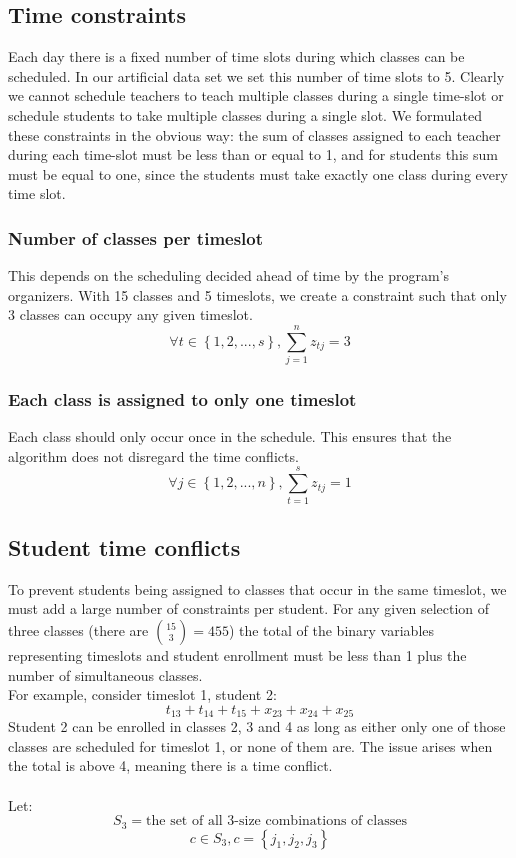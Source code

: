 \documentclass[11pt]{article}
\begin{document}
\subsection{Time constraints}
Each day there is a fixed number of time slots during which classes can be scheduled. In our artificial data set we set this number of time slots to 5. Clearly we cannot schedule teachers to teach multiple classes during a single time-slot or schedule students to take multiple classes during a single slot. We formulated these constraints in the obvious way: the sum of classes assigned to each teacher during each time-slot must be less than or equal to 1, and for students this sum must be equal to one, since the students must take exactly one class during every time slot.\\
\subsubsection{Number of classes per timeslot}
This depends on the scheduling decided ahead of time by the program's organizers. With 15 classes and 5 timeslots, we create a constraint such that only 3 classes can occupy any given timeslot.
\[\forall t \in \left\{ {1,2,...,s}\right\}, \sum_{j=1}^{n}z_{tj} = 3\]
\subsubsection{Each class is assigned to only one timeslot}
Each class should only occur once in the schedule. This ensures that the algorithm does not disregard the time conflicts.
\[\forall j \in \left\{ {1,2,...,n}\right\}, \sum_{t=1}^{s}z_{tj} = 1\]
\subsection{Student time conflicts}
To prevent students being assigned to classes that occur in the same timeslot, we must add a large number of constraints per student. For any given selection of three classes (there are $\binom {15}{3} = 455$) the total of the binary variables representing timeslots and student enrollment must be less than 1 plus the number of simultaneous classes.\\ 
\indent For example, consider timeslot 1, student 2:\\
\[t_{13}+t_{14}+t_{15}+x_{23} +x_{24} +x_{25}\]
Student 2 can be enrolled in classes 2, 3 and 4 as long as either only one of those classes are scheduled for timeslot 1, or none of them are. The issue arises when the total is above 4, meaning there is a time conflict.\\\\
\indent Let:
\[S_3 = \text{the set of all 3-size combinations of classes}\]
\[c \in S_3, c = \left\{ {j_1, j_2, j_3}\right\}\]
\end{document}
